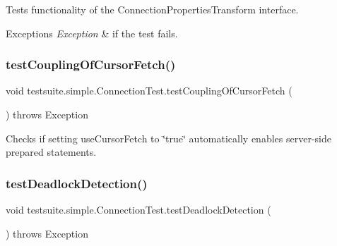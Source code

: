 Tests functionality of the Connection\+Properties\+Transform interface.


\begin{DoxyExceptions}{Exceptions}
{\em Exception} & if the test fails. \\
\hline
\end{DoxyExceptions}
\mbox{\label{classtestsuite_1_1simple_1_1_connection_test_a64a129c95efd45055e9abf405d3eb5b1}} 
\subsubsection{\texorpdfstring{test\+Coupling\+Of\+Cursor\+Fetch()}{testCouplingOfCursorFetch()}}
{\footnotesize\ttfamily void testsuite.\+simple.\+Connection\+Test.\+test\+Coupling\+Of\+Cursor\+Fetch (\begin{DoxyParamCaption}{ }\end{DoxyParamCaption}) throws Exception}

Checks if setting use\+Cursor\+Fetch to \char`\"{}true\char`\"{} automatically enables server-\/side prepared statements. \mbox{\label{classtestsuite_1_1simple_1_1_connection_test_afeddb6540162d5a3efe572d521dcc051}} 
\subsubsection{\texorpdfstring{test\+Deadlock\+Detection()}{testDeadlockDetection()}}
{\footnotesize\ttfamily void testsuite.\+simple.\+Connection\+Test.\+test\+Deadlock\+Detection (\begin{DoxyParamCaption}{ }\end{DoxyParamCaption}) throws Exception}


